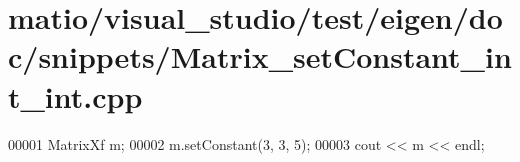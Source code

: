 \hypertarget{matio_2visual__studio_2test_2eigen_2doc_2snippets_2_matrix__set_constant__int__int_8cpp_source}{}\section{matio/visual\+\_\+studio/test/eigen/doc/snippets/\+Matrix\+\_\+set\+Constant\+\_\+int\+\_\+int.cpp}
\label{matio_2visual__studio_2test_2eigen_2doc_2snippets_2_matrix__set_constant__int__int_8cpp_source}

\begin{DoxyCode}
00001 MatrixXf m;
00002 m.setConstant(3, 3, 5);
00003 cout << m << endl;
\end{DoxyCode}
